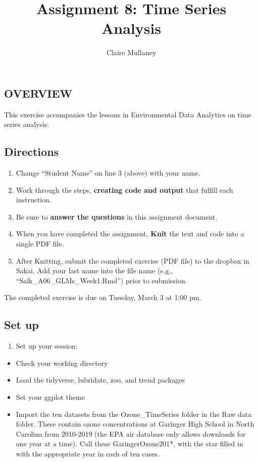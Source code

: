 \documentclass[]{article}
\title{Assignment 8: Time Series Analysis}
\author{Claire Mullaney}
\date{}
\providecommand{\tightlist}{%
  \setlength{\itemsep}{0pt}\setlength{\parskip}{0pt}}
\begin{document}
\maketitle

\hypertarget{overview}{%
\subsection{OVERVIEW}\label{overview}}

This exercise accompanies the lessons in Environmental Data Analytics on
time series analysis.

\hypertarget{directions}{%
\subsection{Directions}\label{directions}}

\begin{enumerate}
\def\labelenumi{\arabic{enumi}.}
\tightlist
\item
  Change ``Student Name'' on line 3 (above) with your name.
\item
  Work through the steps, \textbf{creating code and output} that fulfill
  each instruction.
\item
  Be sure to \textbf{answer the questions} in this assignment document.
\item
  When you have completed the assignment, \textbf{Knit} the text and
  code into a single PDF file.
\item
  After Knitting, submit the completed exercise (PDF file) to the
  dropbox in Sakai. Add your last name into the file name (e.g.,
  ``Salk\_A06\_GLMs\_Week1.Rmd'') prior to submission.
\end{enumerate}

The completed exercise is due on Tuesday, March 3 at 1:00 pm.

\hypertarget{set-up}{%
\subsection{Set up}\label{set-up}}

\begin{enumerate}
\def\labelenumi{\arabic{enumi}.}
\tightlist
\item
  Set up your session:
\end{enumerate}

\begin{itemize}
\tightlist
\item
  Check your working directory
\item
  Load the tidyverse, lubridate, zoo, and trend packages
\item
  Set your ggplot theme
\item
  Import the ten datasets from the Ozone\_TimeSeries folder in the Raw
  data folder. These contain ozone concentrations at Garinger High
  School in North Carolina from 2010-2019 (the EPA air database only
  allows downloads for one year at a time). Call these
  GaringerOzone201*, with the star filled in with the appropriate year
  in each of ten cases.
\end{itemize}
\end{document}
